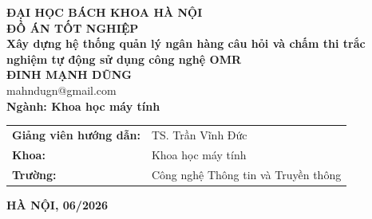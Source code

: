 ﻿\documentclass[DoAn.tex]{subfiles}
\begin{document}
\begin{titlepage}
\thispagestyle{empty}
\begin{center}

{\Large\bfseries ĐẠI HỌC BÁCH KHOA HÀ NỘI}\\[4cm]

{\Huge\bfseries ĐỒ ÁN TỐT NGHIỆP}\\[1cm]
{\Large\bfseries Xây dựng hệ thống quản lý ngân hàng câu hỏi và chấm thi trắc nghiệm tự động sử dụng công nghệ OMR}\\[1cm]

{\large\bfseries ĐINH MẠNH DŨNG}\\
{\large mahndugn@gmail.com}\\[0.5cm]

{\large\bfseries Ngành: Khoa học máy tính}\\[1cm]

\vspace{3cm}

\begin{tabular}{ll}
\textbf{Giảng viên hướng dẫn:} & TS. Trần Vĩnh Đức \\[0.5cm]
\textbf{Khoa:} & Khoa học máy tính \\[0.5cm]
\textbf{Trường:} & Công nghệ Thông tin và Truyền thông \\
\end{tabular}

\vfill

{\bfseries HÀ NỘI, 06/2026}

\end{center}

\end{titlepage}
\end{document}
